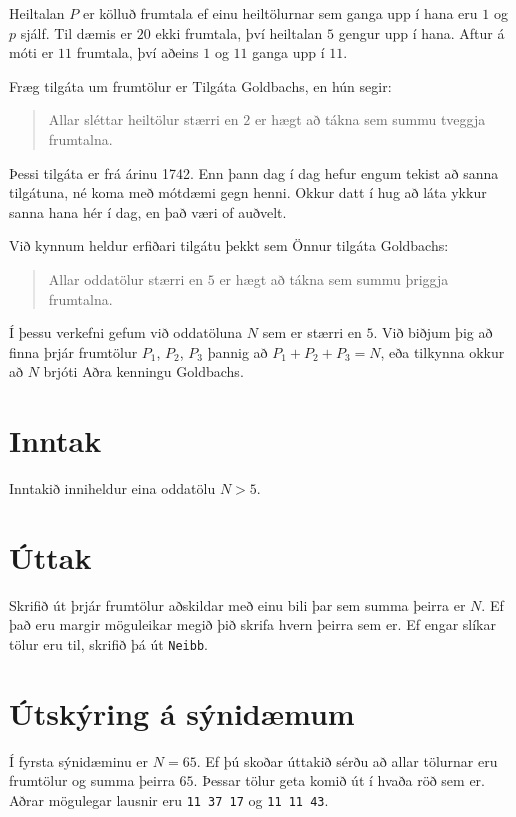 
Heiltalan $P$ er kölluð frumtala ef einu heiltölurnar sem ganga upp í hana eru
$1$ og $p$ sjálf. Til dæmis er $20$ ekki frumtala, því heiltalan $5$ gengur upp
í hana. Aftur á móti er $11$ frumtala, því aðeins $1$ og $11$ ganga upp í $11$.

Fræg tilgáta um frumtölur er Tilgáta Goldbachs, en hún segir:
\begin{quote}
    Allar sléttar heiltölur stærri en $2$ er hægt að tákna sem summu tveggja frumtalna.
\end{quote}

Þessi tilgáta er frá árinu 1742. Enn þann dag í dag hefur engum tekist að sanna tilgátuna,
né koma með mótdæmi gegn henni. Okkur datt í hug að láta ykkur sanna hana hér í dag,
en það væri of auðvelt.

Við kynnum heldur erfiðari tilgátu þekkt sem Önnur tilgáta Goldbachs:
\begin{quote}
    Allar oddatölur stærri en $5$ er hægt að tákna sem summu þriggja frumtalna.
\end{quote}

Í þessu verkefni gefum við oddatöluna $N$ sem er stærri en $5$. Við biðjum þig
að finna þrjár frumtölur $P_1$, $P_2$, $P_3$ þannig að $P_1 + P_2 + P_3 = N$,
eða tilkynna okkur að $N$ brjóti Aðra kenningu Goldbachs.

\section*{Inntak}
Inntakið inniheldur eina oddatölu $N > 5$. 

\section*{Úttak}
Skrifið út þrjár frumtölur aðskildar með einu bili þar sem summa þeirra er $N$.
Ef það eru margir möguleikar megið þið skrifa hvern þeirra sem er. Ef engar
slíkar tölur eru til, skrifið þá út \texttt{Neibb}.

\section*{Útskýring á sýnidæmum}
Í fyrsta sýnidæminu er $N = 65$. Ef þú skoðar úttakið sérðu að allar tölurnar
eru frumtölur og summa þeirra $65$. Þessar tölur geta komið út í hvaða röð sem
er. Aðrar mögulegar lausnir eru \texttt{11 37 17} og \texttt{11 11 43}.

